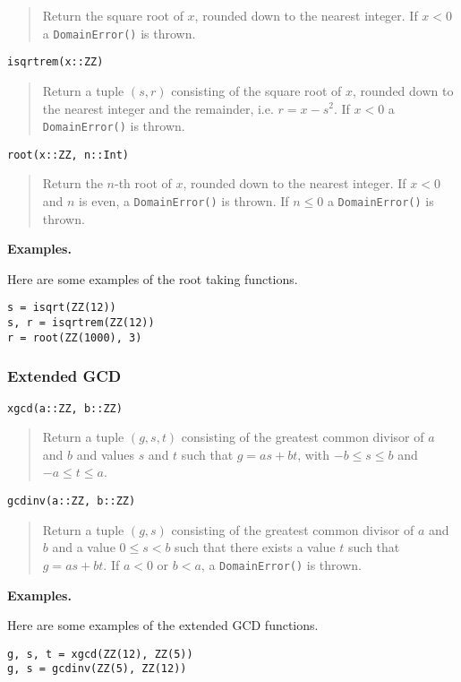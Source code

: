 \documentclass[a4paper,10pt]{article}
\newcommand{\code}{\lstinline}
\newcommand{\desc}[1]{\vspace{-3mm}\begin{quote}#1\end{quote}}
\begin{document}
{{{\desc{Return the square root of $x$, rounded down to the nearest integer. If $x < 0$
a \code{DomainError()} is thrown.}

\begin{lstlisting}
isqrtrem(x::ZZ)
\end{lstlisting}

\desc{Return a tuple $(s, r)$ consisting of the square root of $x$, rounded down to the 
nearest integer and the remainder, i.e. $r = x - s^2$. If $x < 0$ a \code{DomainError()}
is thrown.}

\begin{lstlisting}
root(x::ZZ, n::Int)
\end{lstlisting}

\desc{Return the $n$-th root of $x$, rounded down to the nearest integer. If $x < 0$ and
$n$ is even, a \code{DomainError()} is thrown. If $n \leq 0$ a \code{DomainError()} is
thrown.}

\textbf{Examples.}

Here are some examples of the root taking functions.

\begin{lstlisting}
s = isqrt(ZZ(12))
s, r = isqrtrem(ZZ(12))
r = root(ZZ(1000), 3)
\end{lstlisting}

\subsubsection{Extended GCD}

\begin{lstlisting}
xgcd(a::ZZ, b::ZZ)
\end{lstlisting}

\desc{Return a tuple $(g, s, t)$ consisting of the greatest common divisor of $a$ and $b$
and values $s$ and $t$ such that $g = as + bt$, with $-b \leq s \leq b$ and 
$-a \leq t \leq a$.}

\begin{lstlisting}
gcdinv(a::ZZ, b::ZZ)
\end{lstlisting}

\desc{Return a tuple $(g, s)$ consisting of the greatest common divisor of $a$ and $b$
and a value $0 \leq s < b$ such that there exists a value $t$ such that 
$g = as + bt$. If $a < 0$ or $b < a$, a \code{DomainError()} is thrown.}

\textbf{Examples.}

Here are some examples of the extended GCD functions.

\begin{lstlisting}
g, s, t = xgcd(ZZ(12), ZZ(5))
g, s = gcdinv(ZZ(5), ZZ(12))
\end{lstlisting}

}}}
\end{document}
